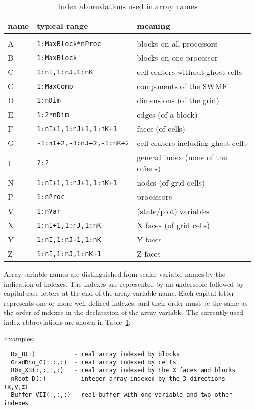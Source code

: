 \documentclass{article}
\begin{document}
\begin{table}
\caption{Index abbreviations used in array names}
\begin{center}
\begin{tabular}{lll}
name &   typical range                 &  meaning \\
\hline \\
A    & {\tt 1:MaxBlock*nProc}          &  blocks on all processors \\
B    & {\tt 1:MaxBlock}                &  blocks on one processor \\
C    & {\tt 1:nI,1:nJ,1:nK}            &  cell centers without ghost cells \\
C    & {\tt 1:MaxComp}                 &  components of the SWMF \\
D    & {\tt 1:nDim}                    &  dimensions (of the grid) \\
E    & {\tt 1:2*nDim}                  &  edges (of a block) \\
F    & {\tt 1:nI+1,1:nJ+1,1:nK+1}      &  faces (of cells) \\
G    & {\tt -1:nI+2,-1:nJ+2,-1:nK+2}   &  cell centers including ghost cells \\
I    & {\tt ?:?}                       &  general index (none of the others) \\
N    & {\tt 1:nI+1,1:nJ+1,1:nK+1}      &  nodes (of grid cells) \\
P    & {\tt 1:nProc}                   &  processors \\
V    & {\tt 1:nVar}                    &  (state/plot) variables \\
X    & {\tt 1:nI+1,1:nJ,1:nK}          &  X faces (of grid cells) \\
Y    & {\tt 1:nI,1:nJ+1,1:nK}          &  Y faces \\
Z    & {\tt 1:nI,1:nJ,1:nK+1}          &  Z faces
\end{tabular}
\end{center}
\label{tab:index}
\end{table}
Array variable names are distinguished from scalar variable names
by the indication of indexes. The indexes are represented by 
an underscore followed by capital case letters at the end 
of the array variable name. Each capital letter represents
one or more well defined indexes, and their order must be the
same as the order of indexes in the declaration of the array variable.
The currently used index abbreviations are shown in Table~\ref{tab:index}.

Examples:
\begin{verbatim}
  Dx_B(:)           - real array indexed by blocks
  GradRho_C(:,:,:)  - real array indexed by cells
  B0x_XB(:,:,:,:)   - real array indexed by the X faces and blocks
  nRoot_D(:)        - integer array indexed by the 3 directions (x,y,z)
  Buffer_VII(:,:,:) - real buffer with one variable and two other indexes
\end{verbatim}
\end{document}
